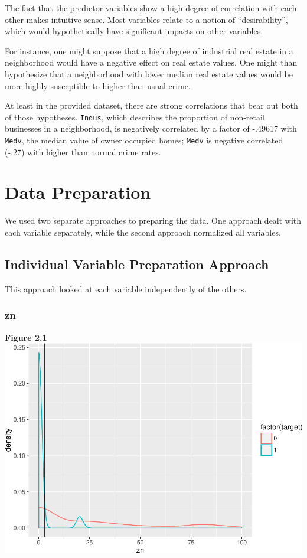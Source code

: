 \documentclass[]{article}
\begin{document}
The fact that the predictor variables show a high degree of correlation
with each other makes intuitive sense. Most variables relate to a notion
of ``desirability'', which would hypothetically have significant impacts
on other variables.

For instance, one might suppose that a high degree of industrial real
estate in a neighborhood would have a negative effect on real estate
values. One might than hypothesize that a neighborhood with lower median
real estate values would be more highly susceptible to higher than usual
crime.

At least in the provided dataset, there are strong correlations that
bear out both of those hypotheses. \texttt{Indus}, which describes the
proportion of non-retail businesses in a neighborhood, is negatively
correlated by a factor of -.49617 with \texttt{Medv}, the median value
of owner occupied homes; \texttt{Medv} is negative correlated (-.27)
with higher than normal crime rates.

\section{Data Preparation}\label{data-preparation}

We used two separate approaches to preparing the data. One approach
dealt with each variable separately, while the second approach
normalized all variables.

\subsection{Individual Variable Preparation
Approach}\label{individual-variable-preparation-approach}

This approach looked at each variable independently of the others.

\subsubsection{zn}\label{zn}

\textbf{Figure
2.1}\\\includegraphics{HW3_Final_files/figure-latex/unnamed-chunk-5-1.pdf}
\end{document}
